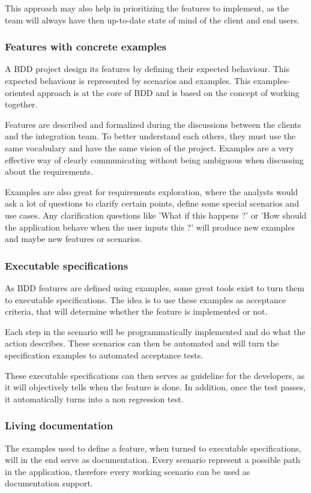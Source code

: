 This approach may also help in prioritizing the features to implement, as the
team will always have then up-to-date state of mind of the client and end
users.

\subsubsection{Features with concrete examples}
A BDD project design its features by defining their expected behaviour.
This expected behaviour is represented by scenarios and examples.
This examples-oriented approach is at the core of BDD and is based on
the concept of working together.

Features are described and formalized during the discussions between the
clients and the integration team.
To better understand each others, they must use the same vocabulary and have
the same vision of the project.
Examples are a very effective way of clearly communicating without being
ambiguous when discussing about the requirements.

Examples are also great for requirements exploration, where the analysts
would ask a lot of questions to clarify certain points, define some special
scenarios and use cases.
Any clarification questions like 'What if this happens ?' or 'How should the
application behave when the user inputs this ?' will produce new examples and
maybe new features or scenarios.

\subsubsection{Executable specifications}
As BDD features are defined using examples, some great tools exist to turn
them to executable specifications.
The idea is to use these examples as acceptance criteria, that will determine
whether the feature is implemented or not.

Each step in the scenario will be programmatically implemented and do what
the action describes.
These scenarios can then be automated and will turn the specification
examples to automated acceptance tests.

These executable specifications can then serves as guideline for the
developers, as it will objectively tells when the feature is done.
In addition, once the test passes, it automatically turns into a non regression
test.

\subsubsection{Living documentation}
The examples used to define a feature, when turned to executable
specifications, will in the end serve as documentation.
Every scenario represent a possible path in the application, therefore every
working scenario can be used as documentation support.

